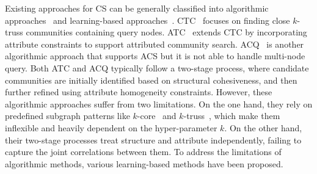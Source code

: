 Existing approaches for CS can be generally classified into algorithmic approaches~\cite{CTC,ACQ,ATC} and learning-based approaches~\cite{AQDGNN,ICSGNN,communityAF,coclep,cgnp}.
CTC~\cite{CTC} focuses on finding close $k$-truss communities containing query nodes. ATC~\cite{ATC} extends CTC by incorporating attribute constraints to support attributed community search.
ACQ~\cite{ACQ} is another algorithmic approach that supports ACS but it is not able to handle multi-node query. Both ATC and ACQ typically follow a two-stage process, where candidate communities are initially identified based on structural cohesiveness, and then further refined using attribute homogeneity constraints.
However, these algorithmic approaches suffer from two limitations. On the one hand, they rely on predefined subgraph patterns like $k$-core~\cite{li2015influential,sozio2010community,cui2014local} and $k$-truss~\cite{huang2014querying,akbas2017truss}, which make them inflexible and heavily dependent on the hyper-parameter $k$. On the other hand, their two-stage processes treat structure and attribute independently, failing to capture the joint correlations between them.
To address the limitations of algorithmic methods, various learning-based methods have been proposed. 


